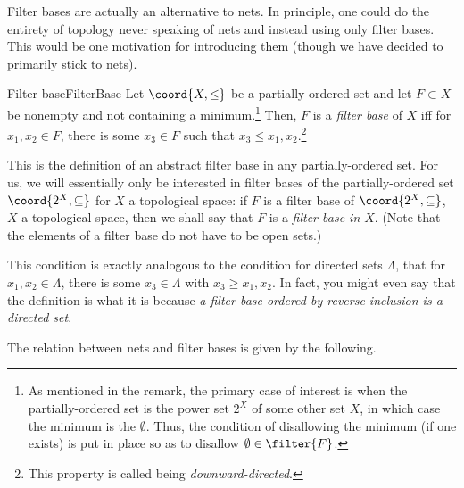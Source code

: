 Filter bases are actually an alternative to nets.  In principle, one could do the entirety of topology never speaking of nets and instead using only filter bases.  This would be one motivation for introducing them (though we have decided to primarily stick to nets).
\begin{dfn}{Filter base}{FilterBase}
Let $\coord{X,\leq}$ be a partially-ordered set and let $F\subset X$ be nonempty and not containing a minimum.\footnote{As mentioned in the remark, the primary case of interest is when the partially-ordered set is the power set $2^X$ of some other set $X$, in which case the minimum is the $\emptyset$.  Thus, the condition of disallowing the minimum (if one exists) is put in place so as to disallow $\emptyset \in \filter{F}$.}  Then, $F$ is a \emph{filter base} of $X$ iff for $x_1,x_2\in F$, there is some $x_3\in F$ such that $x_3\leq x_1,x_2$.\footnote{This property is called being \emph{downward-directed}.}
\begin{rmk}
This is the definition of an abstract filter base in any partially-ordered set.  For us, we will essentially only be interested in filter bases of the partially-ordered set $\coord{2^X,\subseteq}$ for $X$ a topological space:  if $F$ is a filter base of $\coord{2^X,\subseteq}$, $X$ a topological space, then we shall say that $F$ is a \emph{filter base in $X$}.  (Note that the elements of a filter base do not have to be open sets.)
\end{rmk}
\begin{rmk}
This condition is exactly analogous to the condition for directed sets $\Lambda$, that for $x_1,x_2\in \Lambda$, there is some $x_3\in \Lambda$ with $x_3\geq x_1,x_2$.  In fact, you might even say that the definition is what it is because \emph{a filter base ordered by reverse-inclusion is a directed set}.
\end{rmk}
\end{dfn}
The relation between nets and filter bases is given by the following.

